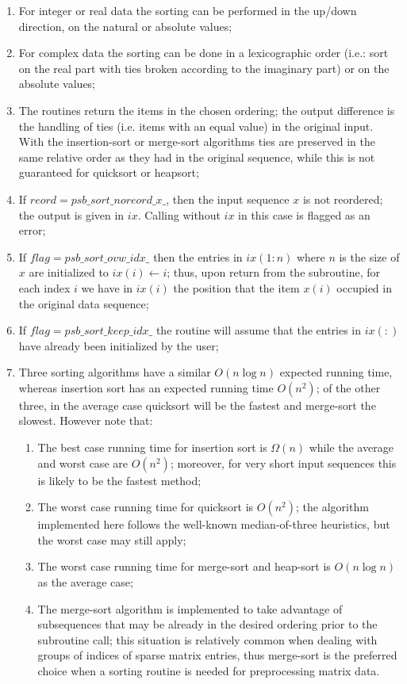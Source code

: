 \begin{enumerate}
\item For integer or real data the sorting can be performed in the up/down direction, on the
  natural or absolute values;
\item For  complex data the sorting can  be done in a lexicographic
  order (i.e.: sort on the real part with ties broken according to
  the imaginary part) or on the absolute values; 
\item The routines return the items in the chosen ordering; the
  output difference is the handling of  ties (i.e. items with an
  equal   value) in the original input. With the insertion-sort or merge-sort algorithms 
  ties are   preserved in the same relative order as they had in the
  original   sequence,  while this is not guaranteed for quicksort or
  heapsort;
\item If $reord=psb\_sort\_noreord\_x\_$, then the input sequence $x$
  is not reordered; the output is given in $ix$. Calling without $ix$
  in this case is flagged as an error;
\item If $flag = psb\_sort\_ovw\_idx\_$ then the entries in $ix(1:n)$
  where $n$ is the size of $x$ are initialized to $ix(i) \leftarrow
  i$; thus, upon return from the subroutine, for each
  index $i$ we have in $ix(i)$ the position that the item $x(i)$
  occupied in the original data sequence;
\item If $flag = psb\_sort\_keep\_idx\_$  the routine will assume that
  the entries in $ix(:)$ have already been initialized by the user;
\item Three sorting algorithms have a similar $O(n \log n)$ expected
  running time, whereas insertion sort has an expected running time
  $O(n^2)$; of the other three, in the average case quicksort will be the 
  fastest and merge-sort the slowest. However note that:
  \begin{enumerate}
  \item The  best case running time for insertion sort is $\Omega(n)$
    while the average and worst case  are $O(n^2)$; moreover, for
    very short input sequences this is likely to be the  fastest
    method; 
 \item The worst case running time for quicksort is $O(n^2)$; the algorithm
  implemented here follows the well-known median-of-three heuristics,
  but the worst case may still apply;
\item The worst case running time for merge-sort and heap-sort is
  $O(n\log n)$  as the average case;
\item The merge-sort algorithm is implemented to take advantage of 
  subsequences that may be already in the desired ordering prior to
  the subroutine call; this situation is relatively common when
  dealing with groups of indices of sparse matrix entries, thus
  merge-sort is the preferred  choice when a sorting routine is needed 
  for preprocessing matrix data.
\end{enumerate}
\end{enumerate}



